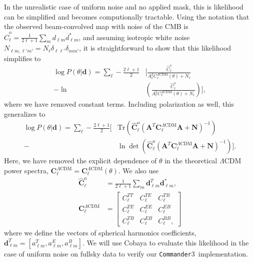 \documentclass[twocolumn]{../common/aa}
\def\commander{\texttt{Commander}}
\begin{document}
In the unrealistic case of uniform noise and no applied mask, this is likelihood can be simplified and becomes computionally tractable. Using the notation that the observed beam-convolved map with noise of the CMB is $\hat{C}^{\mathrm{o}}_{\ell} = \frac{1}{2\ell+1}\sum_m d_{\ell m}d^*_{\ell m}$, and assuming isotropic white noise $N_{\ell m, \ell'm'} = N_\ell \delta_{\ell \ell'}\delta_{mm'}$, it is straightforward to show that this likelihood simplifies to
\begin{align}
    \nonumber
    \log P(\theta | \textbf{d}) = \sum_{\ell} -\frac{2\ell+1}{2} &\bigg[\frac{\hat{C}^{\mathrm{o}}_{\ell}}{A_\ell^2 C^{\Lambda \mathrm{CDM}}_{\ell}(\theta) + N_\ell}\\
    -\ln &\left(\frac{\hat{C}^{\mathrm{o}}_{\ell}}{A_\ell^2 C^{\Lambda \mathrm{CDM}}_{\ell}(\theta) + N_\ell} \right) \bigg],
\end{align}
where we have removed constant terms. Including polarization as well, this generalizes to \citep{Hamimeche:2008ai}
\begin{align}
    \nonumber
    \log P(\theta | \textbf{d}) = \sum_\ell -\frac{2\ell+1}{2} \bigg[&\mathrm{Tr}\left(\hat{\boldsymbol C}^{\mathrm{o}}_{\ell}  \left(\textbf{A}^T \textbf{C}^{\Lambda\mathrm{CDM}}_{\ell} \textbf{A} + \textbf{N}\right)^{-1}\right)\\
    - &\ln \det \left(\hat{\boldsymbol C}^\mathrm{o}_{\ell}  \left(\textbf{A}^T \textbf{C}^{\Lambda\mathrm{CDM}}_{\ell} \textbf{A} + \textbf{N}\right)^{-1}\right)\bigg].
\end{align}
Here, we have removed the explicit dependence of $\theta$ in the theoretical $\Lambda$CDM power spectra, $\textbf{C}^{\Lambda\mathrm{CDM}}_{\ell} = \textbf{C}^{\Lambda\mathrm{CDM}}_{\ell}(\theta)$. We also use
\begin{align}
    \hat{\boldsymbol C}^{\mathrm{o}}_{\ell} &= \frac{1}{2\ell+1}\sum_m \boldsymbol{d}_{\ell m}^T \boldsymbol{d}^*_{\ell m},\\
    \textbf{C}^{\Lambda\mathrm{CDM}}_{\ell} &= \begin{bmatrix}
        C^{TT}_\ell & C^{TE}_\ell & C^{TB}_\ell\\
        C^{TE}_\ell & C^{EE}_\ell & C^{EB}_\ell\\
        C^{TB}_\ell & C^{EB}_\ell & C^{BB}_\ell,
    \end{bmatrix}
\end{align}
where we define the vectors of spherical harmonics coefficients, ${\boldsymbol{d}_{\ell m}^T = [a^T_{\ell m}, a^E_{\ell m}, a^B_{\ell m}]}$. We will use Cobaya \citep{Torrado:2020dgo} to evaluate this likelihood in the case of uniform noise on fullsky data to verify our \commander3\ implementation.
\end{document}
